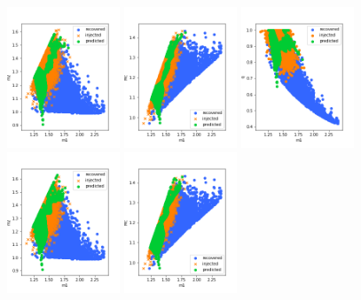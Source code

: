 \documentclass[prd,aps,twocolumn,a4paper,showkeys,nofootinbib]{article}
\begin{document}
\begin{figure}[]
  \center
  \includegraphics[width=0.3\textwidth]{./Figs/80_masses}
  \includegraphics[width=0.3\textwidth]{./Figs/80_Mc}
  \includegraphics[width=0.3\textwidth]{./Figs/80_q}
  \includegraphics[width=0.3\textwidth]{./Figs/100_masses}
  \includegraphics[width=0.3\textwidth]{./Figs/100_Mc}

\end{figure}
\end{document}
